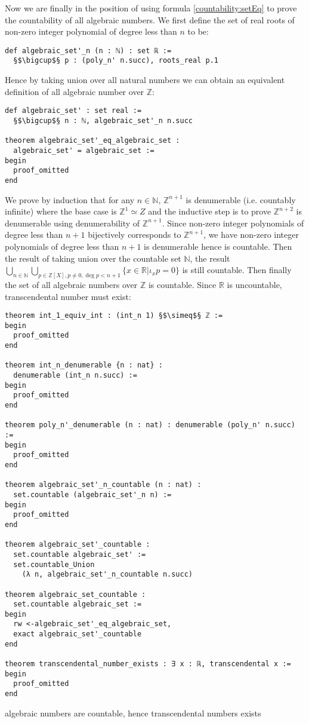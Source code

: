 \documentclass{report}
\theoremstyle{definition}
\theoremstyle{plain}
\newenvironment{code}{\captionsetup{type=listing}}{}
\begin{document}
Now we are finally in the position of using formula \ref{countability:setEq} to prove the countability of all algebraic numbers. We first define the set of real roots of non-zero integer polynomial of degree less than $n$ to be:
\begin{verbatim}
def algebraic_set'_n (n : ℕ) : set ℝ := 
  §$\bigcup$§ p : (poly_n' n.succ), roots_real p.1
\end{verbatim}
Hence by taking union over all natural numbers we can obtain an equivalent definition of all algebraic number over $\mathbb{Z}$:
\begin{verbatim}
def algebraic_set' : set real := 
  §$\bigcup$§ n : ℕ, algebraic_set'_n n.succ

theorem algebraic_set'_eq_algebraic_set : 
  algebraic_set' = algebraic_set :=
begin
  proof_omitted
end
\end{verbatim}
We prove by induction that for any $n\in\mathbb N$, $\mathbb{Z}^{n+1}$ is denumerable (i.e. countably infinite) where the base case is $\mathbb Z^1\simeq Z$ and the inductive step is to prove $\mathbb{Z}^{n+2}$ is denumerable using denumerability of $\mathbb{Z}^{n+1}$. Since non-zero integer polynomials of degree less than $n+1$ bijectively corresponds to $\mathbb{Z}^{n+1}$, we have non-zero integer polynomials of degree less than $n+1$ is denumerable hence is countable. Then the result of taking union over the countable set $\mathbb N$, the result $ \bigcup_{n\in\mathbb N}\bigcup_{p\in\mathbb{Z}[X], p\ne 0, \deg{p}<n+1} \{x\in\mathbb{R}|\iota_xp=0\}$ is still countable. Then finally the set of all algebraic numbers over $\mathbb Z$ is countable. Since $\mathbb R$ is uncountable, transcendental number must exist:
\begin{code}
\begin{verbatim}
theorem int_1_equiv_int : (int_n 1) §$\simeq$§ ℤ := 
begin
  proof_omitted
end

theorem int_n_denumerable {n : nat} :
  denumerable (int_n n.succ) :=
begin
  proof_omitted
end

theorem poly_n'_denumerable (n : nat) : denumerable (poly_n' n.succ) :=
begin
  proof_omitted
end

theorem algebraic_set'_n_countable (n : nat) :
  set.countable (algebraic_set'_n n) :=
begin
  proof_omitted
end

theorem algebraic_set'_countable : 
  set.countable algebraic_set' :=
  set.countable_Union 
    (λ n, algebraic_set'_n_countable n.succ)

theorem algebraic_set_countable : 
  set.countable algebraic_set :=
begin
  rw <-algebraic_set'_eq_algebraic_set, 
  exact algebraic_set'_countable
end

theorem transcendental_number_exists : ∃ x : ℝ, transcendental x :=
begin
  proof_omitted
end
\end{verbatim}
\caption{algebraic numbers are countable, hence transcendental numbers exists}
\end{code}
\end{document}

